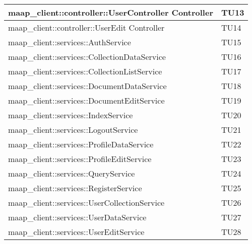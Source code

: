 \begin{center}
\begin{longtable}{|p{12cm}|p{2cm}|}
\midrule
maap\_client::controller::UserController Controller & TU13\\

\midrule
maap\_client::controller::UserEdit Controller & TU14\\


\midrule
maap\_client::services::AuthService & TU15\\

\midrule
maap\_client::services::CollectionDataService & TU16\\

\midrule
maap\_client::services::CollectionListService & TU17\\

\midrule
maap\_client::services::DocumentDataService & TU18\\

\midrule
maap\_client::services::DocumentEditService & TU19\\

\midrule
maap\_client::services::IndexService & TU20\\

\midrule
maap\_client::services::LogoutService & TU21\\

\midrule
maap\_client::services::ProfileDataService & TU22\\

\midrule
maap\_client::services::ProfileEditService & TU23\\

\midrule
maap\_client::services::QueryService & TU24\\

\midrule
maap\_client::services::RegisterService & TU25\\

\midrule
maap\_client::services::UserCollectionService & TU26\\

\midrule
maap\_client::services::UserDataService & TU27\\

\midrule
maap\_client::services::UserEditService & TU28\\


\end{longtable}
\end{center}